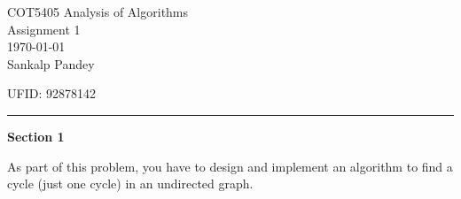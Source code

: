 \documentclass[12pt,letterpaper, onecolumn]{exam}
\begin{document}
\begingroup  
    \centering
    \LARGE COT5405 Analysis of Algorithms\\
    \LARGE Assignment 1\\[0.5em]
    \large \today\\[0.5em]
    \large Sankalp Pandey\par
    \large UFID: 92878142\par
\endgroup
\rule{\textwidth}{0.4pt}
\pointsdroppedatright   %
\printanswers
\renewcommand{\solutiontitle}{\noindent\textbf{Ans:}\enspace}   %
\begingroup
    \centering
    \LARGE \textbf{Section 1}\\
\endgroup
\vspace{16pt}
\par[50 marks] As part of this problem, you have to design and implement an algorithm to find a cycle (just one cycle) in an undirected graph.
\end{document}

